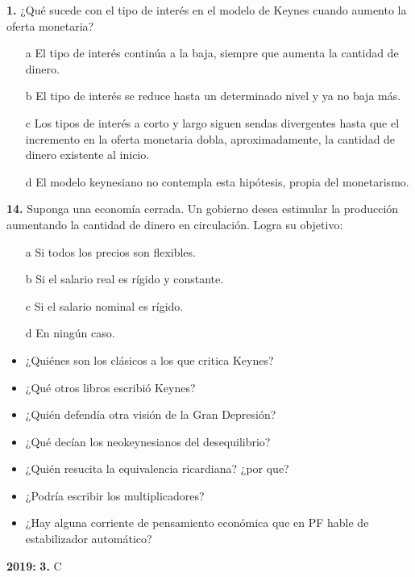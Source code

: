 \documentclass{nuevotema}
\begin{document}
\textbf{1.} ¿Qué sucede con el tipo de interés en el modelo de Keynes cuando aumento la oferta monetaria?

\begin{enumerate}
	\item[a] El tipo de interés continúa a la baja, siempre que aumenta la cantidad de dinero.
	\item[b] El tipo de interés se reduce hasta un determinado nivel y ya no baja más.
	\item[c] Los tipos de interés a corto y largo siguen sendas divergentes hasta que el incremento en la oferta monetaria dobla, aproximadamente, la cantidad de dinero existente al inicio.
	\item[d] El modelo keynesiano no contempla esta hipótesis, propia del monetarismo. 
\end{enumerate}

\textbf{14.} Suponga una economía cerrada. Un gobierno desea estimular la producción aumentando la cantidad de dinero en circulación. Logra su objetivo: 

\begin{enumerate}
	\item[a] Si todos los precios son flexibles.
	\item[b] Si el salario real es rígido y constante.
	\item[c] Si el salario nominal es rígido. 
	\item[d] En ningún caso.
\end{enumerate}

\begin{itemize}
    \item ¿Quiénes son los clásicos a los que critica Keynes?
    \item ¿Qué otros libros escribió Keynes?
    \item ¿Quién defendía otra visión de la Gran Depresión?
    \item ¿Qué decían los neokeynesianos del desequilibrio?
    \item ¿Quién resucita la equivalencia ricardiana? ¿por que?
    \item ¿Podría escribir los multiplicadores?
    \item ¿Hay alguna corriente de pensamiento económica que en PF hable de estabilizador automático?
\end{itemize}

\notas

\textbf{2019:} \textbf{3.} C
\end{document}
